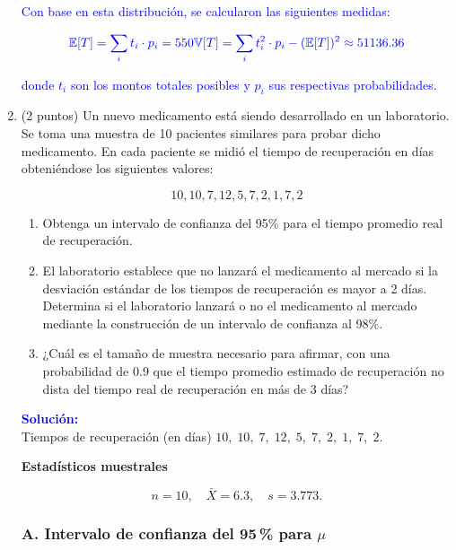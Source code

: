 \documentclass[12pt]{article}
\begin{document}
\begin{enumerate}
	      \textcolor{blue}{Con base en esta distribución, se calcularon las siguientes medidas:}

	      \[
		      \textcolor{blue}{\mathbb{E}[T] = \sum_i t_i \cdot p_i = 550} \\
		      \textcolor{blue}{\mathbb{V}[T] = \sum_i t_i^2 \cdot p_i - (\mathbb{E}[T])^2 \approx 51136.36}
	      \]

	      \textcolor{blue}{donde \(t_i\) son los montos totales posibles y \(p_i\) sus respectivas probabilidades.}

	\item (2 puntos) Un nuevo medicamento está siendo desarrollado en un laboratorio. Se toma una muestra de 10 pacientes similares para probar dicho medicamento. En cada paciente se midió el tiempo de recuperación en días obteniéndose los siguientes valores:

	      \[
		      10, 10, 7, 12, 5, 7, 2, 1, 7, 2
	      \]

	      \begin{enumerate}
		      \item Obtenga un intervalo de confianza del 95\% para el tiempo promedio real de
		            recuperación.
		      \item El laboratorio establece que no lanzará el medicamento al mercado si la
		            desviación estándar de los tiempos de recuperación es mayor a 2 días. Determina
		            si el laboratorio lanzará o no el medicamento al mercado mediante la
		            construcción de un intervalo de confianza al 98\%.
		      \item ¿Cuál es el tamaño de muestra necesario para afirmar, con una probabilidad de 0.9 que el tiempo promedio estimado de recuperación no dista del tiempo real de recuperación en más de 3 días?
	      \end{enumerate}
	      \begingroup\color{blue}

	      \textcolor{blue}{\textbf{Solución:}} \\
	      Tiempos de recuperación (en días)
	      \(10,\;10,\;7,\;12,\;5,\;7,\;2,\;1,\;7,\;2\).

	      \vspace{0.5em}
	      \textbf{Estadísticos muestrales}

	      \[
		      n = 10,
		      \quad
		      \bar X = 6.3,
		      \quad
		      s = 3.773.
	      \]

	      \subsubsection*{A. Intervalo de confianza del 95\,\% para \(\mu\)}


\end{enumerate}
\end{document}
